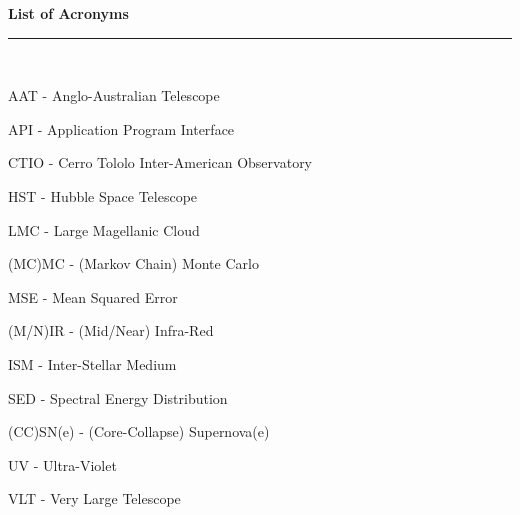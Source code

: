 \thispagestyle{empty}
\begin{raggedleft}
\vspace*{23mm}
\hfill {\huge {\bf {List of Acronyms}}} \\
\vspace{6mm}
\hfill \rule{4in}{.015in} \\
\vspace{19mm}
\end{raggedleft}




%
%

AAT - Anglo-Australian Telescope

API - Application Program Interface

CTIO - Cerro Tololo Inter-American Observatory

HST - Hubble Space Telescope

LMC - Large Magellanic Cloud

(MC)MC - (Markov Chain) Monte Carlo

MSE - Mean Squared Error

(M/N)IR - (Mid/Near) Infra-Red 

ISM - Inter-Stellar Medium

SED - Spectral Energy Distribution

(CC)SN(e) - (Core-Collapse) Supernova(e)

UV - Ultra-Violet

VLT - Very Large Telescope
